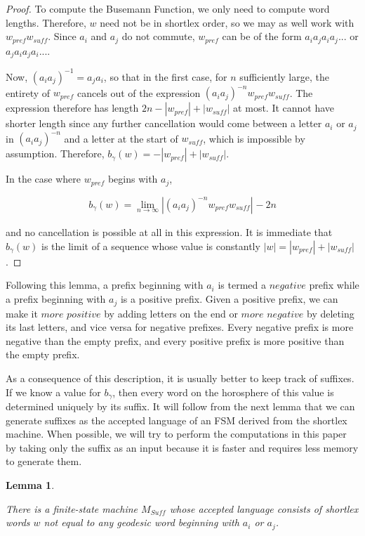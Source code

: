 \documentclass[10pt,a4paper]{amsart}
\newtheorem{lemma}[theorem]{Lemma}
\theoremstyle{definition}
\theoremstyle{remark}
\begin{document}
	\begin{proof}
		
		To compute the Busemann Function, we only need to compute word lengths. Therefore, $w$ need not be in shortlex order, so we may as well work with $w_{pref}w_{suff}$.	Since $a_i$ and $a_j$ do not commute, $w_{pref}$ can be of the form $a_ia_ja_ia_j...$ or $a_ja_ia_ja_i...$.
		
		Now, $(a_ia_j)^{-1}=a_ja_i$, so that in the first case, for $n$ sufficiently large, the entirety of $w_{pref}$ cancels out of the expression $(a_ia_j)^{-n}w_{pref}w_{suff}$. The expression therefore has length \newline $2n-|w_{pref}|+|w_{suff}|$ at most. It cannot have shorter length since any further cancellation would come between a letter $a_i$ or $a_j$ in $(a_ia_j)^{-n}$ and a letter at the start of $w_{suff}$, which is impossible by assumption. Therefore, $b_\gamma(w)=-|w_{pref}|+|w_{suff}|$.
				
		In the case where $w_{pref}$ begins with $a_j$, 
		
		$$b_\gamma(w)=\lim_{n\to\infty} |(a_ia_j)^{-n}w_{pref}w_{suff}|_{\phantom{ }}-2n$$
		
		and no cancellation is possible at all in this expression. It is immediate that $b_\gamma(w)$ is the limit of a sequence whose value is constantly $|w|=|w_{pref}|+|w_{suff}|$. 		
	\end{proof}
	
	Following this lemma, a prefix beginning with $a_i$ is termed a $\textit{negative}$ prefix while a prefix beginning with $a_j$ is a positive prefix. Given a positive prefix, we can make it $\textit{more positive}$ by adding letters on the end or $\textit{more negative}$ by deleting its last letters, and vice versa for negative prefixes. Every negative prefix is more negative than the empty prefix, and every positive prefix is more positive than the empty prefix.
	
	As a consequence of this description, it is usually better to keep track of suffixes. If we know a value for $b_\gamma$, then every word on the horosphere of this value is determined uniquely by its suffix. It will follow from the next lemma that we can generate suffixes as the accepted language of an FSM derived from the shortlex machine. When possible, we will try to perform the computations in this paper by taking only the suffix as an input because it is faster and requires less memory to generate them.
	
	\begin{lemma}\label{ShortlexSuffixMachine}
		
		There is a finite-state machine $M_{Suff}$ whose accepted language consists of shortlex words $w$ not equal to any geodesic word beginning with $a_i$ or $a_j$.
		
	\end{lemma}
	
\end{document}
